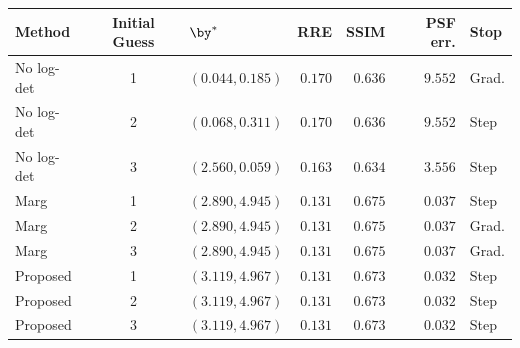 \begin{tabular}{@{}lclrrrl@{}}
\toprule
Method & Initial Guess & $\by^*$ & RRE & SSIM & PSF err. & Stop \\
\midrule
No log-det & 1 & $(0.044,0.185)$ & $0.170$ & $0.636$ & $9.552$ & Grad. \\
No log-det & 2 & $(0.068,0.311)$ & $0.170$ & $0.636$ & $9.552$ & Step \\
No log-det & 3 & $(2.560,0.059)$ & $0.163$ & $0.634$ & $3.556$ & Step \\
\addlinespace[3pt]
Marg & 1 & $(2.890,4.945)$ & $\mathbf{0.131}$ & $\mathbf{0.675}$ & $0.037$ & Step \\
Marg & 2 & $(2.890,4.945)$ & $\mathbf{0.131}$ & $\mathbf{0.675}$ & $0.037$ & Grad. \\
Marg & 3 & $(2.890,4.945)$ & $\mathbf{0.131}$ & $\mathbf{0.675}$ & $0.037$ & Grad. \\
\addlinespace[3pt]
Proposed & 1 & $(3.119,4.967)$ & $\mathbf{0.131}$ & $0.673$ & $\mathbf{0.032}$ & Step \\
Proposed & 2 & $(3.119,4.967)$ & $\mathbf{0.131}$ & $0.673$ & $\mathbf{0.032}$ & Step \\
Proposed & 3 & $(3.119,4.967)$ & $\mathbf{0.131}$ & $0.673$ & $\mathbf{0.032}$ & Step \\
\bottomrule
\end{tabular}
